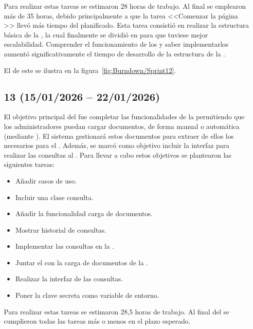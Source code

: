 Para realizar estas tareas se estimaron 28 horas de trabajo. Al final se emplearon más de 35 horas, debido principalmente a que la tarea <<Comenzar la página >> llevó más tiempo del planificado. Esta tarea consistió en realizar la estructura básica de la , la cual finalmente  se dividió en  para que tuviese mejor escalabilidad. Comprender el funcionamiento de los  y saber implementarlos aumentó significativamente el tiempo de desarrollo de la estructura de la .

El  de este  se ilustra en la figura~\ref{fig:Burndown/Sprint12}.

\subsection{ 13 (15/01/2026 -- 22/01/2026)}
El objetivo principal del  fue completar las funcionalidades de la  permitiendo que los administradores puedan cargar documentos, de forma manual o automática (mediante ). El sistema gestionará estos documentos para extraer de ellos los  necesarios para el . Además, se marcó como objetivo incluir la interfaz para realizar las consultas al . Para llevar a cabo estos objetivos se plantearon las siguientes tareas:
\begin{itemize}
\tightlist
	\item Añadir casos de uso.
	\item Incluir una clase consulta.
	\item Añadir la funcionalidad carga de documentos.
	\item Mostrar historial de consultas.
	\item Implementar las consultas en la .
	\item Juntar el  con la carga de documentos de la .
	\item Realizar la interfaz de las consultas.
	\item Poner la clave secreta como variable de entorno.
\end{itemize}

Para realizar estas tareas se estimaron 28,5 horas de trabajo. Al final del  se cumplieron todas las tareas más o menos en el plazo esperado.

